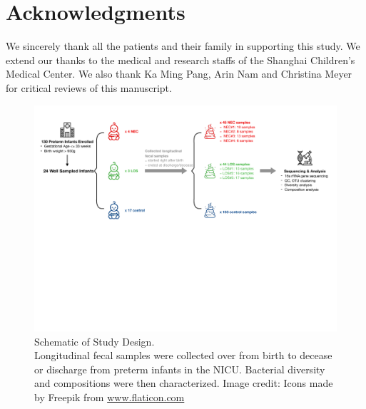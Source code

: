 \documentclass[fleqn,10pt, lineno]{wlpeerj} %
\begin{document}
\section*{Acknowledgments}
We sincerely thank all the patients and their family  in  supporting  this study. We extend our thanks to the medical and research staffs of the Shanghai Children’s Medical Center.  We also thank Ka Ming Pang, Arin Nam and Christina Meyer for critical reviews of this manuscript.



\begin{figure}[ht]
  \centering
  \includegraphics[width=\linewidth]{patinfo.pdf} %
  \caption{Schematic of Study Design. \\ Longitudinal fecal samples were collected over from birth to decease or discharge from preterm infants in the NICU. Bacterial diversity and compositions were then characterized. Image credit: Icons made by Freepik from \href{www.flaticon.com}{www.flaticon.com}}
  \label{fig:design}
\end{figure}
\end{document}
